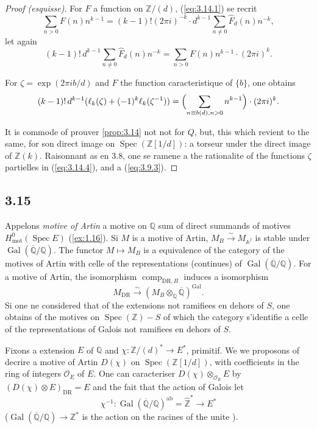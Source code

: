 \documentclass[12pt,a4paper]{article}
\theoremstyle{plain}
\theoremstyle{definition}
\theoremstyle{remark}
\DeclareMathOperator{\Spec}{Spec}
\DeclareMathOperator{\Gal}{Gal}
\newcommand{\mot}{\mathrm{mot}}
\providecommand{\Gal}{\operatorname{Gal}}
\providecommand{\Spec}{\operatorname{Spec}}
\providecommand{\mot}{\mathrm{mot}}
\providecommand{\DR}{\mathrm{DR}}
\providecommand{\comp}{\operatorname{comp}}
\providecommand{\ab}{\mathrm{ab}}
\begin{document}
\begin{proof}[Proof (esquisse)]
For $F$ a function on $\mathbb{Z}/(d)$, (\ref{eq:3.14.1}) se recrit
\begin{equation}\label{eq:3.14.2}
\sum_{n > 0} F(n) n^{k-1} = (k-1)! (2\pi i)^{-k} \cdot d^{k-1} \sum_{n \neq 0}
\hat{F}_d(n) n^{-k},
\end{equation}
let again
\begin{equation}\label{eq:3.14.3}
(k-1)!\, d^{k-1} \sum_{n \neq 0} \hat{F}_d(n) n^{-k} = \sum_{n > 0} F(n) n^{k-1}
\cdot (2\pi i)^k.
\end{equation}

For $\zeta = \exp(2\pi i b/d)$ and $F$ the function caracteristique of $\{b\}$, one obtains
\begin{equation}\label{eq:3.14.4}
(k-1)!\, d^{k-1} (\ell_k(\zeta) + (-1)^k \ell_k(\zeta^{-1})) = \Bigl(\sum_{n \equiv
b(d), n > 0} n^{k-1}\Bigr) \cdot (2\pi i)^k.
\end{equation}

It is commode of prouver \ref{prop:3.14} not not for $Q$, but, this which revient to the
same, for son direct image on $\Spec(\mathbb{Z}[1/d])$: a torseur under the direct image of $\mathbb{Z}(k)$. Raisonnant as en 3.8, one se ramene a the rationalite
of the functions $\zeta$ partielles in (\ref{eq:3.14.4}), and a (\ref{eq:3.9.3}).
\end{proof}

\subsection*{3.15}

Appelons \emph{motive of Artin} a motive on $\mathbb{Q}$ sum of direct summands of
motives $H^0_\mot(\Spec E)$ (\ref{ex:1.16}). Si $M$ is a motive of Artin, $M_B
\xrightarrow{\sim} M_{\mathbb{A}^f}$ is stable under $\Gal(\overline{\mathbb{Q}}/\mathbb{Q})$.
The functor $M \mapsto M_B$ is a equivalence of the category of the motives of Artin
with celle of the representations (continues) of $\Gal(\overline{\mathbb{Q}}/\mathbb{Q})$. For
a motive of Artin, the isomorphism $\comp_{\DR,B}$ induces a isomorphism
\[
M_{\DR} \xrightarrow{\sim} (M_B \otimes_{\mathbb{Q}} \overline{\mathbb{Q}})^{\Gal}.
\]
Si one ne considered that of the extensions not ramifiees en dehors of $S$, one obtains of the
motives on $\Spec(\mathbb{Z}) - S$ of which the category s'identifie a celle of the
representations of Galois not ramifiees en dehors of $S$.

Fixons a extension $E$ of $\mathbb{Q}$ and $\chi: \mathbb{Z}/(d)^* \to E^*$,
primitif. We we proposons of decrire a motive of Artin $D(\chi)$ on
$\Spec(\mathbb{Z}[1/d])$, with coefficients in the ring of integers $\mathcal{O}_E$ of
$E$. One can caracteriser $D(\chi) \otimes_{\mathcal{O}_E} E$ by $(D(\chi) \otimes E)_{\DR}
= E$ and the fait that the action of Galois let
\[
\chi^{-1}: \Gal(\overline{\mathbb{Q}}/\mathbb{Q})^{\ab} = \hat{\mathbb{Z}}^* \longrightarrow E^*
\]
($\Gal(\overline{\mathbb{Q}}/\mathbb{Q}) \to \mathbb{Z}^*$ is the action on the racines of
the unite ).
\end{document}
